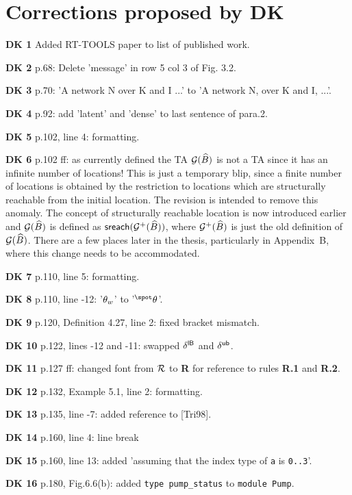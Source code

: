 \documentclass{article}
\begin{document}
\section{Corrections proposed by DK}
\begin{trivlist}
\item[\bf DK 1] Added RT-TOOLS paper to list of published work.
\item[\bf DK 2] p.68: Delete 'message' in row 5 col 3 of Fig. 3.2.
\item[\bf DK 3] p.70: 'A network N over K and I ...' to 'A network N, over 
  K and I, ...'.
\item[\bf DK 4] p.92: add 'latent' and 'dense' to last sentence of para.2.
\item[\bf DK 5] p.102, line 4: formatting.
\item[\bf DK 6] p.102 ff: as currently defined the TA $\mathop{{\cal G}}({\widehat{{B}}})$ is
not a TA since it has an infinite number of locations! This is just a
temporary blip, since a finite number of locations is obtained by the
restriction to locations which are structurally reachable from the
initial location. The revision is intended to remove this anomaly. The concept
of structurally reachable location is now introduced earlier and $\mathop{{\cal G}}({\widehat{{B}}})$
is defined as ${\mathop{\sf sreach}}(\mathop{{\cal G}^+}({\widehat{{B}}}))$, where $\mathop{{\cal G}^+}({\widehat{{B}}})$ is just the
old definition of $\mathop{{\cal G}}({\widehat{{B}}})$. There are a few places later in the thesis,
particularly in Appendix~B, where this change needs to be accommodated.
\item[\bf DK 7] p.110, line 5: formatting.
\item[\bf DK 8] p.110, line -12: '$\theta_{w}$' to '$\preset{\tr}$'.
\item[\bf DK 9] p.120, Definition 4.27, line 2: fixed bracket mismatch.
\item[\bf DK 10] p.122, lines -12 and -11: swapped ${\delta^{{\sf lB}}}$ and ${\delta^{{\sf ub}}}$.
\item[\bf DK 11] p.127 ff: changed font from ${\cal R}$ to \textbf{R} for reference 
to rules \textbf{R.1} and \textbf{R.2}.
\item[\bf DK 12] p.132, Example 5.1, line 2: formatting.
\item[\bf DK 13] p.135, line -7: added reference to [Tri98].
\item[\bf DK 14] p.160, line 4: line break
\item[\bf DK 15] p.160, line 13: added 'assuming that the index type of
  \verb'a' is \verb-0..3-'.
\item[\bf DK 16] p.180, Fig.6.6(b): added \verb'type pump_status' to 
  \verb'module Pump'.

\end{trivlist}
\end{document}
